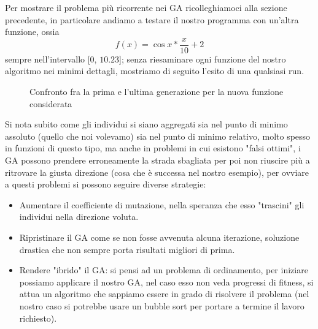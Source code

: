 Per mostrare il problema pi\`u ricorrente nei GA ricolleghiamoci alla sezione precedente, in particolare andiamo a testare il nostro programma con un'altra funzione, ossia $$f(x)=\cos{x}*\frac{x}{10}+2$$ sempre nell'intervallo [$0$, $10.23$]; senza riesaminare ogni funzione del nostro algoritmo nei minimi dettagli, mostriamo di seguito l'esito di una qualsiasi run.
\begin{figure}[H]%
    \centering
    \caption{Confronto fra la prima e l'ultima generazione per la nuova funzione considerata}%
    \label{fig:secondfunction}%
\end{figure}
Si nota subito come gli individui si siano aggregati sia nel punto di minimo assoluto (quello che noi volevamo) sia nel punto di minimo relativo, molto spesso in funzioni di questo tipo, ma anche in problemi in cui esistono "falsi ottimi", i GA possono prendere erroneamente la strada sbagliata per poi non riuscire pi\`u a ritrovare la giusta direzione (cosa che \`e successa nel nostro esempio), per ovviare a questi problemi si possono seguire diverse strategie:
\begin{itemize}
    \item Aumentare il coefficiente di mutazione, nella speranza che esso "trascini" gli individui nella direzione voluta.
    \item Ripristinare il GA come se non fosse avvenuta alcuna iterazione, soluzione drastica che non sempre porta risultati migliori di prima.
    \item Rendere "ibrido" il GA: si pensi ad un problema di ordinamento, per iniziare possiamo applicare il nostro GA, nel caso esso non veda progressi di fitness, si attua un algoritmo che sappiamo essere in grado di risolvere il problema (nel nostro caso si potrebbe usare un bubble sort per portare a termine il lavoro richiesto).
\end{itemize}

